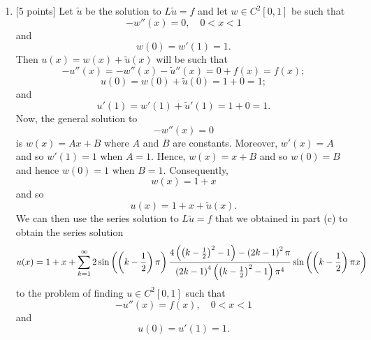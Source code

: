 \begin{solution}
\begin{enumerate}
\item {[5 points]} Let $\tilde{u}$ be the solution to $L\tilde{u}=f$ and let $w\in C^2[0,1]$ be such that
\[
-w''(x)=0,\quad0<x<1
\]
and
\[
w(0)=w'(1)=1.
\]
Then $u(x)=w(x)+\tilde{u}(x)$ will be such that
\[
-u''(x)=-w''(x)-\tilde{u}''(x)=0+f(x)=f(x);
\]
\[
u(0)=w(0)+\tilde{u}(0)=1+0=1;
\]
and
\[
u'(1)=w'(1)+\tilde{u}'(1)=1+0=1.
\]
Now, the general solution to
\[
-w''(x)=0
\]
is $w(x)=Ax+B$ where $A$ and $B$ are constants. Moreover, $w'(x)=A$ and so $w'(1)=1$ when $A=1$. Hence, $w(x)=x+B$ and so $w(0)=B$ and hence $w(0)=1$ when $B=1$. Consequently,
\[
w(x)=1+x
\]
and so
\[
u(x)=1+x+\tilde{u}(x).
\]
We can then use the series solution to $L\tilde{u}=f$ that we obtained in part (c) to obtain the series solution
\[
u(x)=1+x+\sum_{k=1}^\infty 2\sin\left(\left(k-{1\over2}\right)\pi\right){4\left(\left(k-{1\over2}\right)^2-1\right)-\left(2k-1\right)^2\pi \over \left(2k-1\right)^4\left(\left(k-{1\over2}\right)^2-1\right)\pi^4}\sin\left(\left(k-{1\over2}\right)\pi x\right)
\]
to the problem of finding $u\in C^2[0,1]$ such that
\[
-u''(x)=f(x),\quad0<x<1
\]
and
\[
u(0)=u'(1)=1.
\]


\end{enumerate}
\end{solution}
